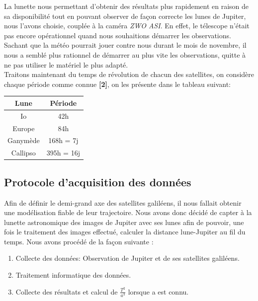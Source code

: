 \documentclass{aa}
\begin{document}
La lunette nous permettant d'obtenir des résultats plus rapidement en raison de sa disponibilité tout en pouvant observer de façon correcte les lunes de Jupiter, nous l'avons choisie, couplée à la caméra \emph{ZWO ASI}. En effet, le télescope n'était pas encore opérationnel quand nous souhaitions démarrer les observations. Sachant que la météo pourrait jouer contre nous durant le mois de novembre, il nous a semblé plus rationnel de démarrer au plus vite les observations, quitte à ne pas utiliser le matériel le plus adapté. \\

Traitons maintenant du temps de révolution de chacun des satellites, on considère chaque période comme connue \textbf{[2]}, on les présente dans le tableau suivant: 


\begin{flushleft}
\centering
    \begin{tabular}{|c|c|}
    \hline
        Lune & Période  \\
    \hline
        Io  & 42h\\
    \hline
        Europe & 84h\\
    \hline
        Ganymède & 168h = 7j \\
    \hline
        Callipso & 395h = 16j \\
    \hline
    \end{tabular}
\end{flushleft}


\subsection{Protocole d'acquisition des données}

Afin de définir le demi-grand axe des satellites galiléens, il nous fallait obtenir une modélisation fiable de leur trajectoire. Nous avons donc décidé de capter à la lunette astronomique des images de Jupiter avec ses lunes afin de pouvoir, une fois le traitement des images effectué, calculer la distance lune-Jupiter au fil du temps. Nous avons procédé de la façon suivante : 

\begin{enumerate}
    \item Collecte des données: Observation de Jupiter et de ses satellites galiléens.
    \item Traitement informatique des données.
    \item Collecte des résultats et calcul de $\frac{T^2}{a^3}$ lorsque a est connu.
\end{enumerate}
\end{document}
